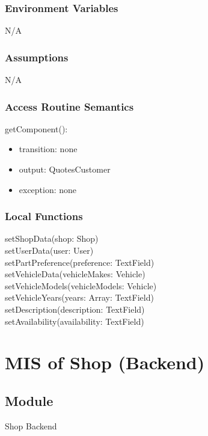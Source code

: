 \documentclass[12pt, titlepage]{article}
\begin{document}
\subsubsection{Environment Variables}

N/A

\subsubsection{Assumptions}

N/A

\subsubsection{Access Routine Semantics}

\noindent getComponent():
\begin{itemize}
\item transition: none
\item output: QuotesCustomer
\item exception: none
\end{itemize}

\subsubsection{Local Functions}

setShopData(shop: Shop) \\
setUserData(user: User) \\
setPartPreference(preference: TextField) \\
setVehicleData(vehicleMakes: Vehicle) \\
setVehicleModels(vehicleModels: Vehicle) \\
setVehicleYears(years: Array: TextField) \\
setDescription(description: TextField) \\
setAvailability(availability: TextField) \\

\newpage

\section{MIS of Shop (Backend)} \label{Module}

\subsection{Module}

Shop Backend
\end{document}
